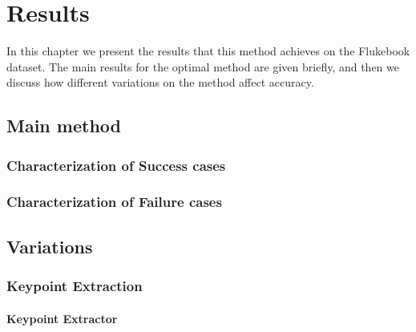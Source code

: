 

\chapter{Results} \label{sec:results}

In this chapter we present the results that this method achieves on the Flukebook dataset.
The main results for the optimal method are given briefly, and then we discuss how different variations on the method affect accuracy.

\section{Main method}


\subsection{Characterization of Success cases}

\subsection{Characterization of Failure cases}

\section{Variations}

\subsection{Keypoint Extraction}

\subsubsection{Keypoint Extractor}

